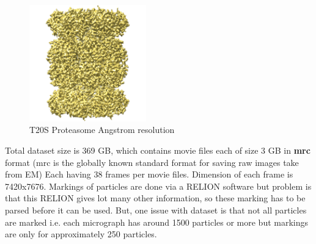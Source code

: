 \documentclass[twoside]{iitbreport}
\begin{document}
\begin{figure}[H]
\includegraphics[width=0.45\textwidth]{EMPIAR-10025}
\centering
\captionsetup{justification=centering}
\caption{T20S Proteasome\protect{} Angstrom resolution}
\label{fig:EMPIAR-10025-3d-struct}
\end{figure}

Total dataset size is 369 GB, which contains movie files each of size 3 GB in \textbf{mrc} format (mrc is the globally known standard format for saving raw images take from EM) Each having 38 frames per movie files. Dimension of each frame is 7420x7676. Markings of particles are done via a RELION \cite{scheres2012relion} software but problem is that this RELION gives lot many other information, so these marking has to be parsed before it can be used. But, one issue with dataset is that not all particles are marked i.e. each micrograph has around 1500 particles or more but markings are only for approximately 250 particles.
\end{document}

